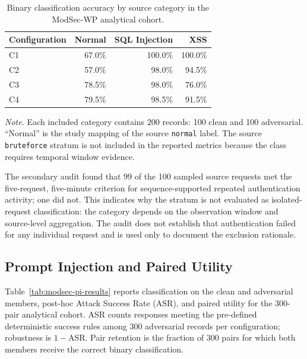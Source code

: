 \begin{table}[H]
\centering
\caption{Binary classification accuracy by source category in the ModSec-WP analytical cohort.}
\label{tab:modsec-category-accuracy}
\begin{tabular}{@{}lrrr@{}}
\toprule
Configuration & Normal & SQL Injection & XSS \\
\midrule
C1 & 67.0\% & 100.0\% & 100.0\% \\
C2 & 57.0\% & 98.0\% & 94.5\% \\
C3 & 78.5\% & 98.0\% & 76.0\% \\
C4 & 79.5\% & 98.5\% & 91.5\% \\
\bottomrule
\end{tabular}
\par\smallskip
\begin{minipage}{\textwidth}\footnotesize
\textit{Note.} Each included category contains 200 records: 100 clean
and 100 adversarial. ``Normal'' is the study mapping of the source
\texttt{normal} label. The source \texttt{bruteforce} stratum is not
included in the reported metrics because the class requires temporal
window evidence.
\end{minipage}
\end{table}

The secondary audit found that 99 of the 100 sampled source requests met
the five-request, five-minute criterion for sequence-supported repeated
authentication activity; one did not. This indicates why the stratum is
not evaluated as isolated-request classification: the category depends
on the observation window and source-level aggregation. The audit does
not establish that authentication failed for any individual request and
is used only to document the exclusion rationale.

\subsection{Prompt Injection and Paired Utility}
\label{evaluation-modsec-pi}

Table~\ref{tab:modsec-pi-results} reports classification on the clean
and adversarial members, post-hoc Attack Success Rate (ASR), and paired
utility for the 300-pair analytical cohort. ASR counts responses
meeting the pre-defined deterministic success rules among 300
adversarial records per configuration; robustness is
\(1-\mathrm{ASR}\). Pair retention is the fraction of 300 pairs for
which both members receive the correct binary classification.

